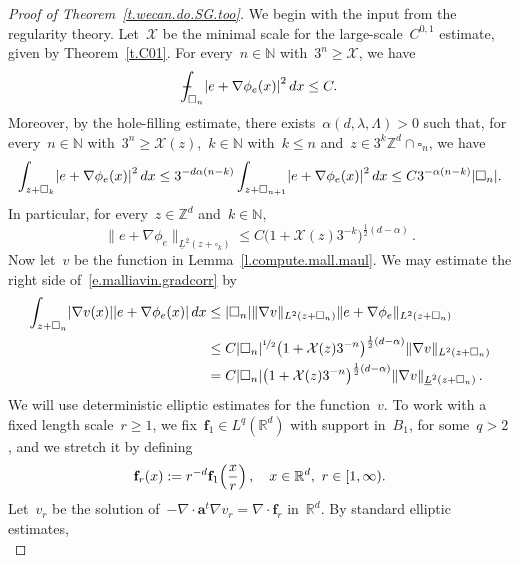 \documentclass[11pt,twoside]{article} %
\let\oldsquare\square %
\renewcommand{\square}{\oldsquare}
\numberwithin{equation}{section}
\theoremstyle{definition}
\let\originalleft\left
\let\originalright\right
\renewcommand{\left}{\mathopen{}\mathclose\bgroup\originalleft}
\renewcommand{\right}{\aftergroup\egroup\originalright}
\newcommand*{\N}{\ensuremath{\mathbb{N}}}
\newcommand*{\Zd}{\ensuremath{\mathbb{Z}^d}}
\newcommand*{\Rd}{\ensuremath{\mathbb{R}^d}}
\newcommand{\f}{\mathbf{f}}
\renewcommand{\a}{\mathbf{a}}
\newcommand{\cu}{\square}
\newcommand{\X}{\mathcal{X}}
\def\Xint#1{\mathchoice
{\XXint\displaystyle\textstyle{#1}}%
{\XXint\textstyle\scriptstyle{#1}}%
{\XXint\scriptstyle\scriptscriptstyle{#1}}%
{\XXint\scriptscriptstyle\scriptscriptstyle{#1}}%
\!\int}
\def\XXint#1#2#3{{\setbox0=\hbox{$#1{#2#3}{\int}$}
\vcenter{\hbox{$#2#3$}}\kern-.5\wd0}}
\def\fint{\Xint-}
\begin{document}
\begin{proof}[{Proof of Theorem~\ref{t.wecan.do.SG.too}}]
We begin with the input from the regularity theory. Let~$\X$ be the minimal scale for the large-scale~$C^{0,1}$ estimate, given by Theorem~\ref{t.C01}. 
For every~$n\in\N$ with~$3^n \geq \X$, we have 
\begin{equation}
\fint_{\cu_n} \left| e+ \nabla \phi_e(x) \right|^2\,dx
\leq 
C.
\end{equation}
Moreover, by the hole-filling estimate, there exists~$\alpha(d,\lambda,\Lambda)>0$ such that, for every~$n\in\N$ with~$3^n\geq \X(z)$,~$k\in\N$ with~$k\leq n$ and~$z\in 3^k\Zd\cap\cu_n$, we have
\begin{equation}
\int_{z+\cu_k} 
\left| e+ \nabla \phi_e(x) \right|^2\,dx
\leq 
3^{-d\alpha(n-k)}
\int_{z+\cu_{n+1}}  \left| e+ \nabla \phi_e(x) \right|^2\,dx
\leq 
C 3^{-\alpha(n-k)} \left| \cu_n \right|.
\end{equation}
In particular, for every~$z\in\Zd$ and~$k\in\N$, 
\begin{equation*}
\| e + \nabla \phi_e \|_{\underline{L}^2(z+\cu_k)}
\leq 
C \bigl( 1+ \X(z) 3^{-k} \bigr)^{\frac12(d-\alpha)}
\,.
\end{equation*}
Now let~$v$ be the function in Lemma~\ref{l.compute.mall.maul}. 
We may estimate the right side of~\eqref{e.malliavin.gradcorr} by 
\begin{align}
\label{e.thisisverydifficult}
\int_{z+\cu_n}
\left| \nabla v(x) \right| \left|e+ \nabla \phi_e(x) \right|\,dx
&
\leq 
| \cu_n | 
\| \nabla v \|_{{L}^2(z+\cu_n)} \| e+\nabla \phi_e \|_{{L}^2(z+\cu_n)}
\notag \\ &
\leq 
C |\cu_n|^{\nicefrac12} \bigl(1+\X(z) 3^{-n} \bigr)^{\frac12(d-\alpha)}
\| \nabla v \|_{{L}^2(z+\cu_n)} 
\notag \\ &
= 
C |\cu_n| \bigl(1+\X(z) 3^{-n} \bigr)^{\frac12(d-\alpha)}
\| \nabla v \|_{\underline{L}^2(z+\cu_n)} 
\,.
\end{align}
We will use deterministic elliptic estimates for the function~$v$.  
To work with a fixed length scale~$r\geq 1$, we fix~$\f_1\in L^{q}(\Rd)$ with support in~$B_1$, for some~$q>2$, and we stretch it by defining
\begin{equation}
\label{e.fr.LSI}
\f_r(x):=  r^{-d} \f_1 \Bigl( \frac xr \Bigr)\,, 
\quad x\in\Rd, \  r\in [1,\infty). 
\end{equation}
Let~$v_r$ be the solution of~$-\nabla \cdot \a^t \nabla v_r = \nabla \cdot \f_r$ in~$\Rd$. By standard elliptic estimates, 
\begin{equation*}

\end{equation*}
\end{proof}
\end{document}
